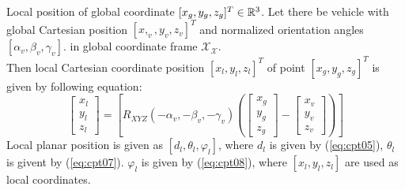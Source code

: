 \begin{definition}{Local position of global coordinate $[x_g,y_g,z_g]^T\in\mathbb{R}^3$.}\label{def:globalToLocal}
    Let there be vehicle with global Cartesian position $[x,_v,y_v,z_v]^T$ and normalized orientation angles $[\alpha_v,\beta_v,\gamma_v]$. in global coordinate frame $\mathscr{X}_\mathscr{X}$.\\
    Then local Cartesian coordinate position $[x_l,y_l,z_l]^T$ of point $[x_g,y_g,z_g]^T$ is given by following equation:
    \begin{equation}
        \begin{bmatrix}
            x_l\\y_l\\z_l
        \end{bmatrix}
        =
        \left [
            R_{XYZ}(-\alpha_v,-\beta_v,-\gamma_v)
            \left (
            \begin{bmatrix}
                x_g\\y_g\\z_g
            \end{bmatrix}
            -
            \begin{bmatrix}
                x_v\\y_v\\z_v
            \end{bmatrix}
            \right )
        \right ]
    \end{equation}
    Local planar position is given as $[d_l, \theta_l,\varphi_l]$, where $d_l$ is given by (\ref{eq:cpt05}), $\theta_l$ is givent by (\ref{eq:cpt07}). $\varphi_l$ is given by (\ref{eq:cpt08}), where $[x_l,y_l,z_l]$ are used as local coordinates.
\end{definition}